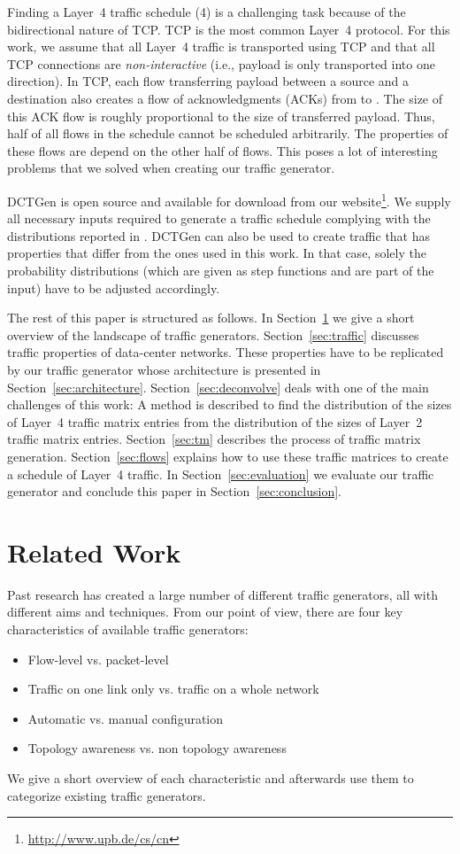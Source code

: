 \documentclass[journal,10pt]{IEEEtran}
\newcommand{\genname}{DCTGen}
\newcommand{\lf}{Layer~4}
\begin{document}
Finding a \lf{} traffic schedule (4) is a challenging task because of the bidirectional nature of TCP.
TCP is the most common Layer~4 protocol. For this work, we assume that all Layer~4 traffic is transported using TCP and that all TCP connections
are \emph{non-interactive} (i.e., payload is only transported into one direction).
In TCP, each flow transferring payload between a source  and a destination  also creates a flow of acknowledgments (ACKs) from  to .
The size of this ACK flow is roughly proportional to the size of transferred payload.
Thus, half of all flows in the schedule cannot be scheduled arbitrarily. The properties of these flows are depend on the other half of flows.
This poses a lot of interesting problems that we solved when creating our traffic generator.

\genname{} is open source and available for download from our website\footnote{\url{http://www.upb.de/cs/cn}}. 
We supply all necessary inputs required to generate a traffic schedule complying with the distributions reported in \cite{MSR-datacenters, datacentersInTheWild}.
\genname{} can also be used to create traffic that has properties that differ from the ones used in this work.
In that case, solely the probability distributions (which are given as step functions and are part of the input) have to be adjusted accordingly.

The rest of this paper is structured as follows. In Section~\ref{sec:relatedWork} we give a short overview of the landscape of 
traffic generators. Section~\ref{sec:traffic} discusses traffic properties of data-center networks. These properties have to be replicated by 
our traffic generator whose architecture is presented in Section~\ref{sec:architecture}.
Section~\ref{sec:deconvolve} deals with one of the main challenges of this work:
A method is described to find the
distribution of the sizes of Layer~4 traffic matrix entries from the distribution of the sizes of Layer~2 traffic matrix entries.
Section~\ref{sec:tm} describes the process of traffic matrix generation. Section~\ref{sec:flows} explains how to use these traffic matrices
to create a schedule of Layer~4 traffic. In Section~\ref{sec:evaluation} we evaluate our traffic generator and conclude this paper
in Section~\ref{sec:conclusion}.

\section{Related Work}
\label{sec:relatedWork}
Past research has created a large number of different traffic generators, all with different aims and techniques.
From our point of view, there are four key characteristics of available traffic generators:
\begin{itemize}
	\item Flow-level vs. packet-level
	\item Traffic on one link only vs. traffic on a whole network
	\item Automatic vs. manual configuration
	\item Topology awareness vs. non topology awareness
\end{itemize}
We give a short overview of each characteristic and afterwards use them to categorize existing traffic generators.
\end{document}
